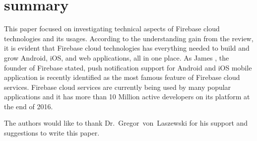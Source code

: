 \section{summary}
This paper focused on investigating technical aspects of Firebase cloud 
technologies and its usages. According to the understanding gain from the 
review, it is evident that Firebase cloud technologies has everything needed to 
build and grow Android, iOS, and web applications, all in one place. As James 
\cite{hid-sp18-409-www-firebase}, the founder of Firebase stated, push 
notification support for Android and iOS mobile application is recently 
identified as the most famous feature of Firebase cloud services. Firebase 
cloud services are currently being used by many popular applications and it has 
more than 10 Million active developers on its platform  at the end of 
2016\cite{hid-sp18-409-www-firebase}.

\begin{acks}

  The authors would like to thank Dr.~Gregor~von~Laszewski for his
  support and suggestions to write this paper.

\end{acks}


 

